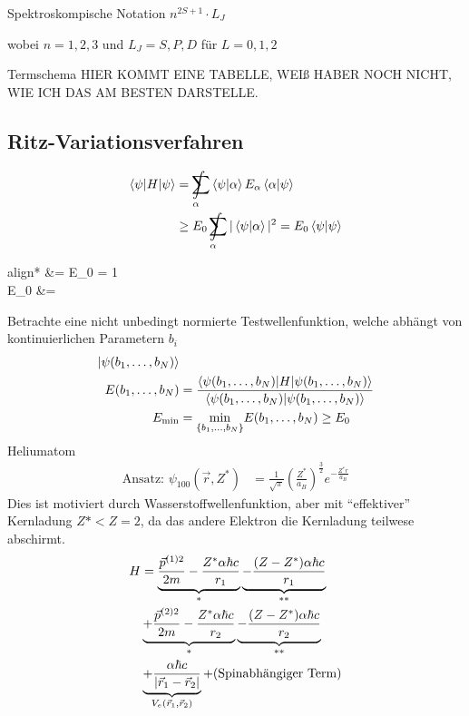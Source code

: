 Spektroskompische Notation $n^{2 S + 1} \cdot L_J$

wobei $n=1,2,3$ und $L_J = S, P, D$ für $L=0, 1, 2$

Termschema
HIER KOMMT EINE TABELLE, WEIß HABER NOCH NICHT, WIE ICH DAS AM BESTEN DARSTELLE. 

\subsection{Ritz-Variationsverfahren}
	\begin{align*}	
	\braket{\psi | H | \psi} &= \int \limits_\alpha\!\!\!\!\!\!\!\!\!\;\sum
	\braket{\psi | \alpha} E_\alpha \braket{\alpha | \psi} \\
	&\geq E_0 \int \limits_\alpha\!\!\!\!\!\!\!\!\!\;\sum |\braket{\psi | \alpha}|^2 
	= E_0 \braket{\psi | \psi}
	\end{align*}
	\begin{empheq}[box=\boxed]{align*}
		\Rightarrow {} &= E_0  \braket{\psi | \psi} = 1 \\
		 E_0 &=  
	\end{empheq}
Betrachte eine nicht unbedingt normierte Testwellenfunktion, welche abhängt von kontinuierlichen Parametern $b_i$
	\begin{align*}
		\ket{\psi (b_1, \ldots, b_N)}& \\
		E(b_1, \ldots, b_N) &= 
		\frac{\braket{\psi (b_1, \ldots, b_N)|H|\psi (b_1, \ldots, b_N)}}{\braket{\psi (b_1, \ldots, b_N)|\psi (b_1, \ldots, b_N)}} \\
		E_{\text{min}} &= \underset{\{b_1, \ldots, b_N\}}{\mathrm{min}}
		E(b_1, \ldots, b_N) \geq E_0
	\end{align*}
Heliumatom
	\begin{align*}
		\text{Ansatz: } \psi_{100}(\vec{r}, Z^*)
		&= \frac{1}{\sqrt{\pi}} \left(\frac{Z^*}{a_B}\right)^{\frac{3}{2}} e^{-\frac{Z^* r}{a_B}}
	\end{align*}
Dies ist motiviert durch Wasserstoffwellenfunktion, aber mit ``effektiver'' Kernladung 
$Z* < Z = 2$, da das andere Elektron die Kernladung teilwese abschirmt.
	\begin{align*}
		H &= \underbrace{\frac{\vec{p}^{(1)2}}{2m} - \frac{Z^* \alpha \hbar c}{r_1}}_{\mathclap{*}}
		\underbrace{- \frac{(Z-Z^*)\alpha \hbar c}{r_1}}_{\mathclap{**}} \\
		&\underbrace{+ \frac{\vec{p}^{(2)2}}{2m} - \frac{Z^* \alpha \hbar c}{r_2}}_{\mathclap{*}}
		\underbrace{- \frac{(Z-Z^*)\alpha \hbar c}{r_2}}_{\mathclap{**}} \\
		&\underbrace{+ \frac{\alpha \hbar c}{|\vec{r}_1 - \vec{r}_2|}}_{\mathclap{V_e(\vec{r}_1, \vec{r}_2)}} + (\text{Spinabhängiger Term})
	\end{align*}
